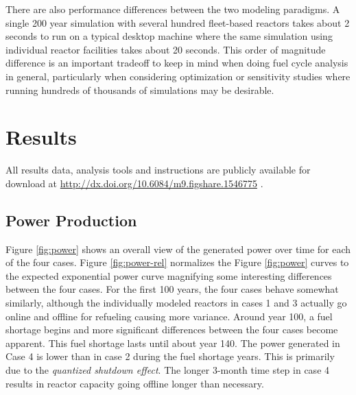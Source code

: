 \documentclass{style}
\begin{document}
There are also performance differences between the two modeling paradigms.  A
single 200 year simulation with several hundred fleet-based reactors takes
about 2 seconds to run on a typical desktop machine where the same simulation
using individual reactor facilities takes about 20 seconds.  This order of
magnitude difference is an important tradeoff to keep in mind when doing fuel
cycle analysis in general, particularly when considering optimization or
sensitivity studies where running hundreds of thousands of simulations may be
desirable.

\section{Results}

All results data, analysis tools and instructions are publicly available for
download at \url{http://dx.doi.org/10.6084/m9.figshare.1546775}
\cite{Carlsen2015}.

\subsection{Power Production}

Figure \ref{fig:power} shows an overall view of the generated
power over time for each of the four cases.  Figure
\ref{fig:power-rel} normalizes the Figure
\ref{fig:power} curves to the expected exponential power curve
magnifying some interesting differences between the four cases.  For the first
100 years, the four cases behave somewhat similarly, although the individually
modeled reactors in cases 1 and 3 actually go online and offline for refueling
causing more variance.  Around year 100, a fuel shortage begins and more
significant differences between the four cases become apparent. This fuel
shortage lasts until about year 140. The power generated in Case 4 is lower
than in case 2 during the fuel shortage years. This is primarily due to the
\emph{quantized shutdown effect}.  The longer 3-month time step in case 4
results in reactor capacity going offline longer than necessary.
\end{document}
